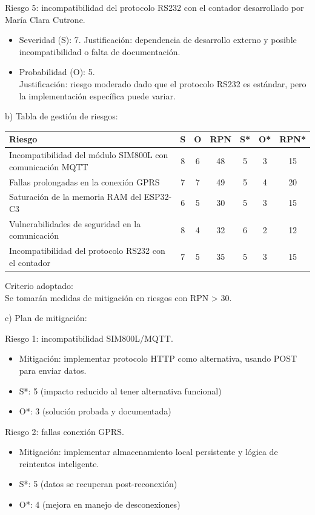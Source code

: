 \documentclass[
11pt, %
]{charter}
\begin{document}
Riesgo 5: incompatibilidad del protocolo RS232 con el contador desarrollado por María Clara Cutrone.
\begin{itemize}
\item Severidad (S): 7. 
Justificación: dependencia de desarrollo externo y posible incompatibilidad o falta de documentación.
\item Probabilidad (O): 5.\\
Justificación: riesgo moderado dado que el protocolo RS232 es estándar, pero la implementación específica puede variar.
\end{itemize}

b) Tabla de gestión de riesgos:

\begin{table}[htpb]
\centering
\begin{tabularx}{\linewidth}{@{}|X|c|c|c|c|c|c|@{}}
\hline
\rowcolor[HTML]{C0C0C0} 
Riesgo & S & O & RPN & S* & O* & RPN* \\ \hline
Incompatibilidad del módulo SIM800L con comunicación MQTT & 8 & 6 & 48 & 5 & 3 & 15 \\ \hline
Fallas prolongadas en la conexión GPRS & 7 & 7 & 49 & 5 & 4 & 20 \\ \hline
Saturación de la memoria RAM del ESP32-C3 & 6 & 5 & 30 & 5 & 3 & 15 \\ \hline
Vulnerabilidades de seguridad en la comunicación & 8 & 4 & 32 & 6 & 2 & 12 \\ \hline
Incompatibilidad del protocolo RS232 con el contador & 7 & 5 & 35 & 5 & 3 & 15 \\ \hline
\end{tabularx}%
\end{table}

Criterio adoptado: \\
Se tomarán medidas de mitigación en riesgos con RPN > 30.

c) Plan de mitigación:


Riesgo 1: incompatibilidad SIM800L/MQTT.
\begin{itemize}
\item Mitigación: implementar protocolo HTTP como alternativa, usando POST para enviar datos.
\item S*: 5 (impacto reducido al tener alternativa funcional)
\item O*: 3 (solución probada y documentada)
\end{itemize}

Riesgo 2: fallas conexión GPRS.
\begin{itemize}
\item Mitigación: implementar almacenamiento local persistente y lógica de reintentos inteligente.
\item S*: 5 (datos se recuperan post-reconexión)
\item O*: 4 (mejora en manejo de desconexiones)
\end{itemize}
\end{document}
